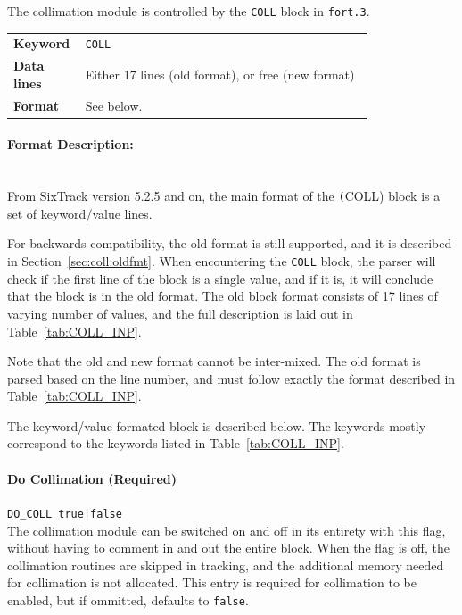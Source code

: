 The collimation module is controlled by the \texttt{COLL} block in \texttt{fort.3}.

\bigskip
\begin{tabular}{@{}lp{0.8\linewidth}}
    \textbf{Keyword}    & \texttt{COLL}\index{COLL} \\
    \textbf{Data lines} & Either 17 lines (old format), or free (new format)\\
    \textbf{Format}     & See below.
\end{tabular}

\paragraph{Format Description:}~\\

From SixTrack version 5.2.5 and on, the main format of the \texttt(COLL) block is a set of keyword/value lines.

For backwards compatibility, the old format is still supported, and it is described in Section~\ref{sec:coll:oldfmt}.
When encountering the \texttt{COLL} block, the parser will check if the first line of the block is a single value, and if it is, it will conclude that the block is in the old format.
The old block format consists of 17 lines of varying number of values, and the full description is laid out in Table~\ref{tab:COLL_INP}.

Note that the old and new format cannot be inter-mixed.
The old format is parsed based on the line number, and must follow exactly the format described in Table~\ref{tab:COLL_INP}.

The keyword/value formated block is described below.
The keywords mostly correspond to the keywords listed in Table~\ref{tab:COLL_INP}.

\paragraph{Do Collimation (Required)} \texttt{DO\_COLL true|false}\\

The collimation module can be switched on and off in its entirety with this flag, without having to comment in and out the entire block.
When the flag is off, the collimation routines are skipped in tracking, and the additional memory needed for collimation is not allocated.
This entry is required for collimation to be enabled, but if ommitted, defaults to \texttt{false}.

